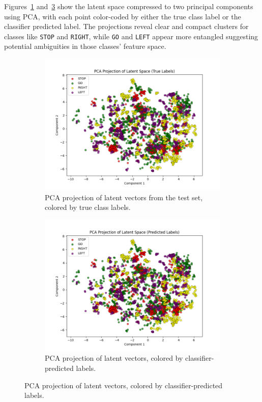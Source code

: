 Figures~\ref{fig:pca_true} and~\ref{fig:pca_pred} show the latent space compressed to two principal components using PCA, with each point color-coded by either the true class label or the classifier predicted label. The projections reveal clear and compact clusters for classes like \texttt{STOP} and \texttt{RIGHT}, while \texttt{GO} and \texttt{LEFT} appear more entangled suggesting potential ambiguities in those classes' feature space.

\begin{figure}[htbp]
    \centering
    \begin{subfigure}[b]{0.49\textwidth}
        \includegraphics[width=\textwidth]{img/vae_results/pca_latent_space_true_labels.png}
        \caption{PCA projection of latent vectors from the test set, colored by true class labels.}
        \label{fig:pca_true}
    \end{subfigure}
    \hfill
    \begin{subfigure}[b]{0.49\textwidth}
        \includegraphics[width=\textwidth]{img/vae_results/pca_latent_space_predicted_labels.png}
        \caption{PCA projection of latent vectors, colored by classifier-predicted labels.}
        \label{fig:pca_pred}
    \end{subfigure}
\end{figure}

